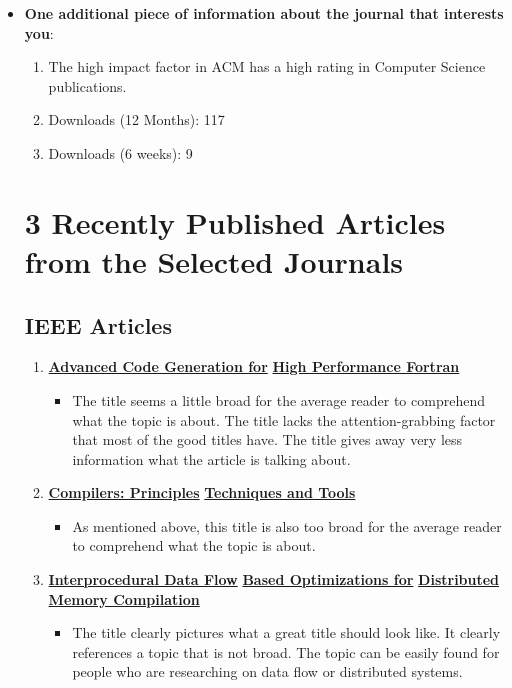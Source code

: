 \documentclass[11pt,twocolumn]{article}
\begin{document}
\begin{itemize}
	     \item {\bf{One additional piece of information about the journal that interests you}}: 
                        \begin{enumerate}
			 \item The high impact factor in ACM has a high rating in Computer Science publications.
                            \item  Downloads (12 Months): 117
			 \item Downloads (6 weeks): 9  \nocite{data}
		       \end{enumerate}


\section{3 Recently Published Articles from the Selected Journals}
\subsection{IEEE Articles}
     \begin{enumerate}
\item \underline{\bf{Advanced Code Generation for}}
\underline{\bf{High Performance Fortran}}
    
   \begin{itemize}
   \item The title seems a little broad for the average reader to comprehend what the topic is about. The title lacks the attention-grabbing factor that most of the good titles have. The title gives away very less information what the article is talking about.\cite{Fortran}
   \end{itemize}

\item \underline{\bf{Compilers: Principles}}
\underline{\bf{Techniques and Tools}}
   \begin{itemize}
    \item As mentioned above, this title is also too broad for the average reader to comprehend what the topic is about. \cite{compiler}
   \end{itemize} 

\item \underline{\bf{Interprocedural Data Flow}} 
\underline{\bf{Based Optimizations for}}
\underline{\bf{Distributed Memory Compilation}}
   \begin{itemize}
    \item The title clearly pictures what a great title should look like. It clearly references a topic that is not broad. The topic can be easily found for people who are researching on data flow or distributed systems.\cite{flow}
   \end{itemize}
 \end{enumerate}


\end{itemize}
\end{document}

